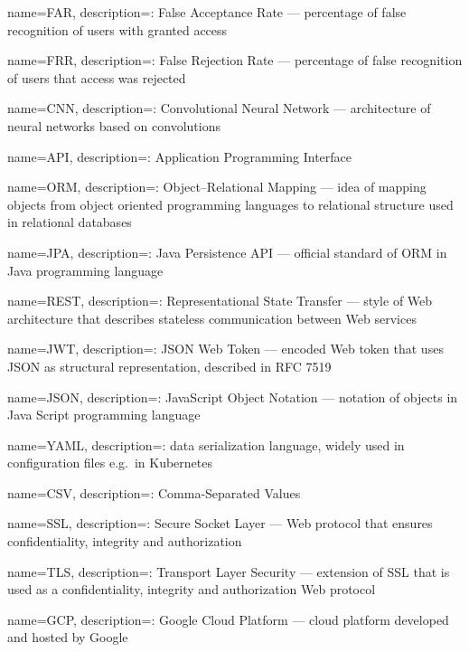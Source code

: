\makeglossaries

{
name=FAR,
description={: False Acceptance Rate --- percentage of false recognition of users with granted access}
}

{
name=FRR,
description={: False Rejection Rate --- percentage of false recognition of users that access was rejected}
}

{
name=CNN,
description={: Convolutional Neural Network --- architecture of neural networks based on convolutions}
}

{
name=API,
description={: Application Programming Interface}
}

{
name=ORM,
description={: Object–Relational Mapping --- idea of mapping objects from object oriented programming languages to relational structure used in relational databases}
}

{
name=JPA,
description={: Java Persistence API --- official standard of ORM in Java programming language}
}

{
name=REST,
description={: Representational State Transfer --- style of Web architecture that describes stateless communication between Web services}
}

{
name=JWT,
description={: JSON Web Token --- encoded Web token that uses JSON as structural representation, described in RFC 7519}
}

{
name=JSON,
description={: JavaScript Object Notation --- notation of objects in Java Script programming language}
}

{
name=YAML,
description={: data serialization language, widely used in configuration files e.g.\ in Kubernetes}
}

{
name=CSV,
description={: Comma-Separated Values}
}

{
name=SSL,
description={: Secure Socket Layer --- Web protocol that ensures confidentiality, integrity and authorization}
}

{
name=TLS,
description={: Transport Layer Security --- extension of SSL that is used as a confidentiality, integrity and authorization Web protocol}
}

{
name=GCP,
description={: Google Cloud Platform --- cloud platform developed and hosted by Google}
}

